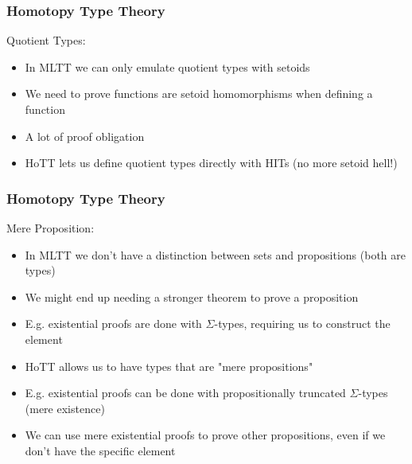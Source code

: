 \documentclass{beamer}
\begin{document}
\begin{frame}
\frametitle{Homotopy Type Theory}

Quotient Types:

\begin{itemize}

  \item In MLTT we can only emulate quotient types with setoids
  \item We need to prove functions are setoid homomorphisms when defining a function
  \item A lot of proof obligation
  \item<2-> HoTT lets us define quotient types directly with HITs (no more setoid hell!)

\end{itemize}

\end{frame}

\begin{frame}
\frametitle{Homotopy Type Theory}

Mere Proposition:

\begin{itemize}

  \item In MLTT we don't have a distinction between sets and propositions (both are types)
  \item We might end up needing a stronger theorem to prove a proposition
  \item E.g. existential proofs are done with $\Sigma$-types, requiring us to construct the element
  \item<2-> HoTT allows us to have types that are "mere propositions"
  \item<2-> E.g. existential proofs can be done with propositionally truncated $\Sigma$-types (mere existence)
  \item<2-> We can use mere existential proofs to prove other propositions, even if we don't have the specific element

\end{itemize}

\end{frame}
\end{document}
